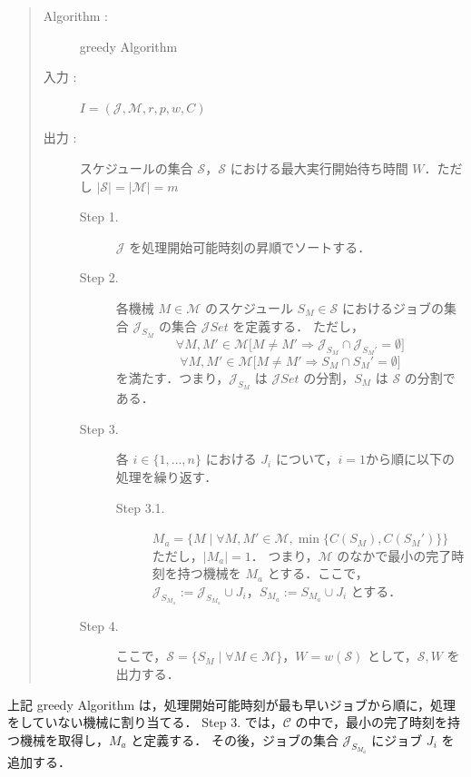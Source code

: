 \documentclass[12pt]{optlab-bachelor}
\begin{document}
\begin{quote}
  \begin{description}
    \item[\sc Algorithm : ] {\sc greedy Algorithm}
    \item[入力 :] $I = (\mathcal{J}, \mathcal{M},r,p,w,C)$
    \item[出力 :] スケジュールの集合 $\mathcal{S}$，$\mathcal{S}$ における最大実行開始待ち時間 $W$．ただし $|\mathcal{S}| = |\mathcal{M}| = m$
    \begin{description}
      \item[Step 1.]
      $\mathcal{J}$ を処理開始可能時刻の昇順でソートする．

      \item[Step 2.]
      各機械 $M \in \mathcal{M}$ のスケジュール $S_M \in \mathcal{S}$ におけるジョブの集合 $\mathcal{J}_{S_M}$ の集合 $\mathcal{J}Set$ を定義する．
      ただし，
      $$\forall M, M' \in \mathcal{M}\big[M \neq M' \Rightarrow \mathcal{J}_{S_M} \cap \mathcal{J}_{S_M'} = \emptyset \big]$$
      $$\forall M, M' \in \mathcal{M}\big[M \neq M' \Rightarrow S_M \cap S_M' = \emptyset \big]$$
      を満たす．つまり，$\mathcal{J}_{S_M}$ は $\mathcal{J}Set$ の分割，$S_M$ は $\mathcal{S}$ の分割である．

      \item[Step 3.]
      各 $i \in \{1,\ldots,n\}$ における $J_i$ について，$i = 1$から順に以下の処理を繰り返す．
      \begin{description}
        \item[Step 3.1.]
        $M_a = \big\{M \mid \forall M, M' \in \mathcal{M}, \min\{C(S_M), C(S_M')\}\big\}$ \\ただし，$|M_a| = 1$．
        つまり，$\mathcal{M}$ のなかで最小の完了時刻を持つ機械を
        $M_a$ とする．ここで，
        $\mathcal{J}_{S_{M_a}} := \mathcal{J}_{S_{M_a}} \cup J_i$，$S_{M_a} := S_{M_a} \cup J_i$ とする．
      \end{description}

      \item[Step 4.]
      ここで，$\mathcal{S} = \{ S_M \mid \forall M \in \mathcal{M}\}$，$W = w(\mathcal{S})$ として，$\mathcal{S},W$ を出力する．
    \end{description}
  \end{description}
\end{quote}

上記 {\sc greedy Algorithm} は，処理開始可能時刻が最も早いジョブから順に，処理をしていない機械に割り当てる．
Step 3. では，$\mathcal{C}$ の中で，最小の完了時刻を持つ機械を取得し，$M_a$ と定義する．
その後，ジョブの集合 $\mathcal{J}_{S_{M_a}}$ にジョブ $J_i$ を追加する．
\end{document}
